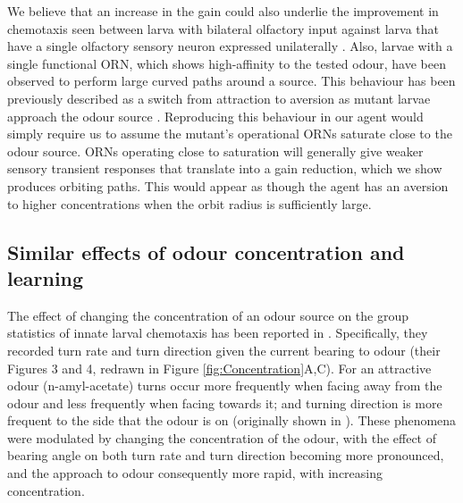 \documentclass[11pt,a4paper]{article}
\newcommand{\todoML}[1]{\todo[author=ML,color=white, size=\tiny,inline]{#1}}
\begin{document}
We believe that an increase in the gain could also underlie the improvement in chemotaxis seen between larva with bilateral olfactory input against larva that have a single olfactory sensory neuron expressed unilaterally  \citep{louis2008bilateral}. 
  Also, larvae with a single functional ORN, which shows high-affinity to the tested odour, have been observed to perform large curved paths around a source. This behaviour has been previously described as a switch from attraction to aversion as mutant larvae approach the odour source \citep{gomez2011active, kreher2008translation}. %
  Reproducing this behaviour in our agent would simply require us to assume the mutant's operational ORNs saturate close to the odour source. ORNs operating close to saturation will generally give weaker sensory transient responses that translate into a gain reduction, which we show produces orbiting paths. This would appear as though the agent has an aversion to higher concentrations when the orbit radius is sufficiently large.
 
 


\subsection{Similar effects of odour concentration and learning}
The effect of changing the concentration of an odour source on the group statistics of innate larval chemotaxis has been reported in \citep{schleyer2015impact}.
 Specifically, they recorded turn rate and turn direction given the current bearing to odour (their Figures 3 and 4, redrawn in Figure \ref{fig:Concentration}A,C).
  For an attractive odour (n-amyl-acetate) turns occur more frequently when facing away from the odour and less frequently when facing towards it; and turning direction is more frequent to the side that the odour is on (originally shown in \citet{gomez2011active}).
   These phenomena were modulated by changing the concentration of the odour, with the effect of bearing angle on both turn rate and turn direction becoming more pronounced, and the approach to odour consequently more rapid, with increasing concentration. 
\end{document}
